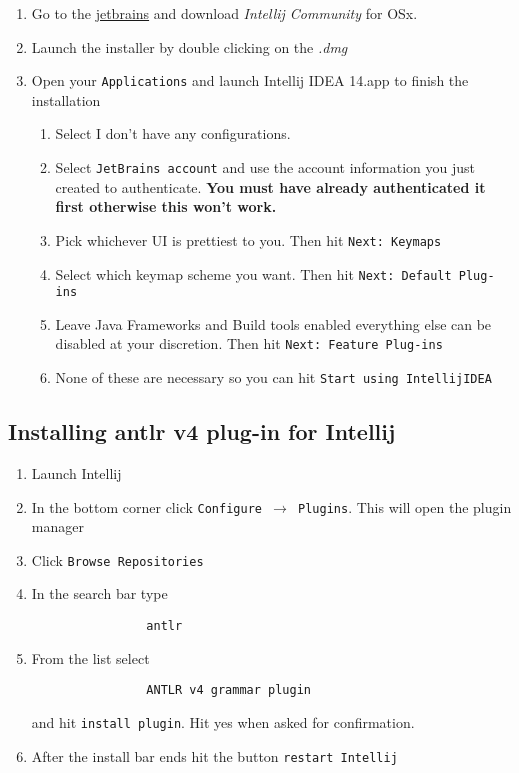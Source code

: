 \documentclass{article}
\begin{document}
		\begin{enumerate}
			\item Go to the \href{https://www.jetbrains.com/idea/download/index.html} {jetbrains} and download
			\textit{Intellij Community} for OSx.
			\item Launch the installer by double clicking on the \textit{.dmg}
			\item Open your \texttt{Applications} and launch Intellij IDEA 14.app to finish the installation
			\begin{enumerate}
				\item Select I don't have any configurations.
				\item Select \texttt{JetBrains account} and use the account information you just created to
				authenticate. \textbf{You must have already authenticated it first otherwise this won't work.}
				\item Pick whichever UI is prettiest to you. Then hit \texttt{Next: Keymaps}
				\item Select which keymap scheme you want. Then hit \texttt{Next: Default Plug-ins}
				\item Leave Java Frameworks and Build tools enabled everything else can be disabled at your discretion.
				Then hit \texttt{Next: Feature Plug-ins}
				\item None of these are necessary so you can hit \texttt{Start using IntellijIDEA}
			\end{enumerate}
		\end{enumerate}

	\subsection{Installing antlr v4 plug-in for Intellij}
		\begin{enumerate}
			\item Launch Intellij
			\item In the bottom corner click \texttt{Configure $\rightarrow$ Plugins}. This will open the plugin manager
			\item Click \texttt{Browse Repositories}
			\item In the search bar type
			\begin{lstlisting}
				antlr
			\end{lstlisting}
			\item From the list select
			\begin{lstlisting}
				ANTLR v4 grammar plugin
			\end{lstlisting}
			and hit \texttt{install plugin}. Hit yes when asked for confirmation.
			\item After the install bar ends hit the button \texttt{restart Intellij}
		\end{enumerate}
\end{document}
